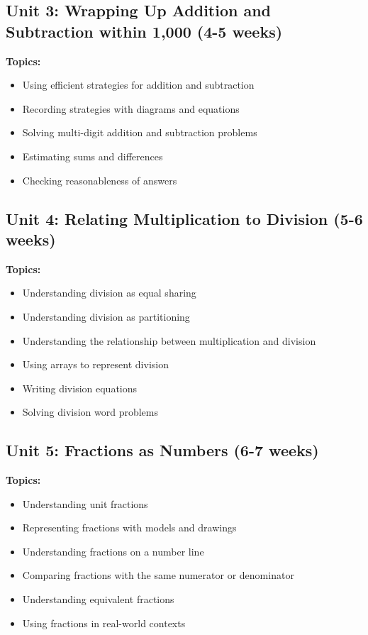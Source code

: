 \documentclass[11pt,letterpaper]{report}
\begin{document}
\subsection{Unit 3: Wrapping Up Addition and Subtraction within 1,000 (4-5 weeks)}

\textbf{Topics:}
\begin{itemize}
    \item Using efficient strategies for addition and subtraction
    \item Recording strategies with diagrams and equations
    \item Solving multi-digit addition and subtraction problems
    \item Estimating sums and differences
    \item Checking reasonableness of answers
\end{itemize}

\subsection{Unit 4: Relating Multiplication to Division (5-6 weeks)}

\textbf{Topics:}
\begin{itemize}
    \item Understanding division as equal sharing
    \item Understanding division as partitioning
    \item Understanding the relationship between multiplication and division
    \item Using arrays to represent division
    \item Writing division equations
    \item Solving division word problems
\end{itemize}

\subsection{Unit 5: Fractions as Numbers (6-7 weeks)}

\textbf{Topics:}
\begin{itemize}
    \item Understanding unit fractions
    \item Representing fractions with models and drawings
    \item Understanding fractions on a number line
    \item Comparing fractions with the same numerator or denominator
    \item Understanding equivalent fractions
    \item Using fractions in real-world contexts
\end{itemize}
\end{document}
